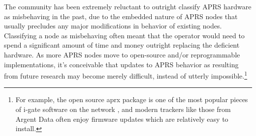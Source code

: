 The community has been extremely reluctant to outright classify APRS hardware
as misbehaving in the past,
due to the embedded nature of APRS nodes that usually precludes any major
modifications in behavior of existing nodes.
Classifying a node as misbehaving often meant that the operator would need to
spend a significant amount of time and money outright replacing the deficient hardware.
As more APRS nodes move to open-source and/or reprogrammable implementations,
it's conceivable that updates to APRS behavior as resulting 
from future research may become merely difficult,
instead of utterly impossible.\footnote{For example, the open source aprx package is
	one of the most popular pieces of i-gate software on the network \cite{aprxpopular},
	and modern trackers like those from Argent Data often
enjoy firmware updates which are relatively easy to install.}

